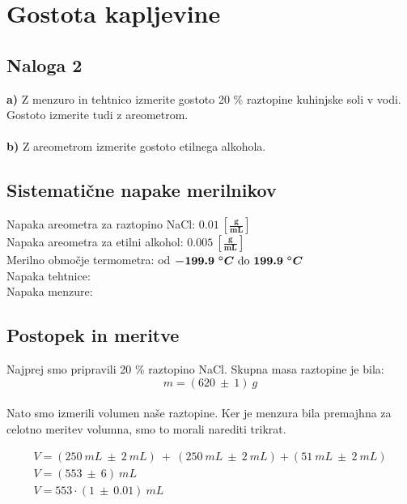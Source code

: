 \documentclass{report}
\begin{document}
\pagebreak

\section{Gostota kapljevine}
\subsection{Naloga 2}
\textbf{a)} Z menzuro in tehtnico izmerite gostoto 20 \% raztopine kuhinjske soli v vodi. Gostoto izmerite tudi z areometrom.\\\\
\textbf{b)} Z areometrom izmerite gostoto etilnega alkohola.

\subsection{Sistematične napake merilnikov}
Napaka areometra za raztopino NaCl: $\bm{0.01 \ \left[ \frac{g}{mL} \right]}$ \\
Napaka areometra za etilni alkohol: $\bm{0.005 \ \left[ \frac{g}{mL} \right]}$ \\
Merilno območje termometra: od $\bm{-199.9\ ^{\circ}C$} do \bm{$199.9\ ^{\circ}C}$ \\
Napaka tehtnice:  \\
Napaka menzure: 
\\

\pagebreak

\subsection{Postopek in meritve}

Najprej smo pripravili 20 \% raztopino NaCl. Skupna masa raztopine je bila:
\begin{equation}
  m = (620 \ \pm \ 1 )\ g 
\end{equation}
\\
Nato smo izmerili volumen naše raztopine. Ker je menzura bila premajhna za 
celotno meritev volumna, smo to morali narediti trikrat.

\begin{equation}
  \label{eq:1}
  \begin{gathered}
    V = (250 \ mL \ \pm \ 2 \ mL) \ + \ (250 \ mL \ \pm \ 2 \ mL) + (51 \ mL \ \pm \ 2 \ mL) \\
    V = (553 \ \pm \ 6) \ mL \\
    V = 553 \cdot (1 \ \pm \ 0.01) \ mL
  \end{gathered}
\end{equation}
\\
\end{document}
